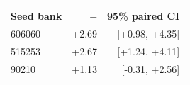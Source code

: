 \begin{tabular}{lrr}
\toprule
Seed bank & \vsix{} $-$ \vfive{} & 95\% paired CI \\
\midrule
606060 & +2.69 & [+0.98, +4.35] \\
515253 & +2.67 & [+1.24, +4.11] \\
90210 & +1.13 & [-0.31, +2.56] \\
\bottomrule
\end{tabular}
